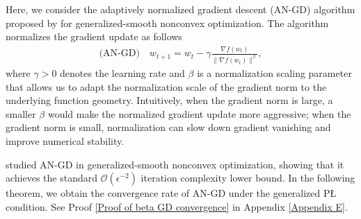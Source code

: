 \documentclass[10pt]{article} %
\begin{document}
Here, we consider the adaptively normalized gradient descent (AN-GD) algorithm proposed by \citet{pmlr-v202-chen23ar} for generalized-smooth nonconvex optimization. The algorithm normalizes the gradient update as follows
\begin{align}\label{eq: AN-GD}
    \text{(AN-GD)} \quad w_{t+1} = w_t - \gamma \frac{\nabla f(w_t)}{ \| \nabla f(w_t) \|^{\beta}},
\end{align}
where $\gamma>0$ denotes the learning rate and $\beta$ is a normalization scaling parameter that allows us to adapt the normalization scale of the gradient norm to the underlying function geometry. Intuitively, when the gradient norm is large, a smaller $\beta$ would make the normalized gradient update more aggressive; when the gradient norm is small, normalization can slow down gradient vanishing and improve numerical stability. 

\citet{pmlr-v202-chen23ar} studied AN-GD in generalized-smooth nonconvex optimization, showing that it achieves the standard $\mathcal{O}(\epsilon^{-2})$ iteration complexity lower bound. In the following theorem, we obtain the convergence rate of AN-GD under the generalized P{\L} condition. See Proof \ref{Proof of beta GD convergence} in Appendix \ref{Appendix E}. 
\end{document}
